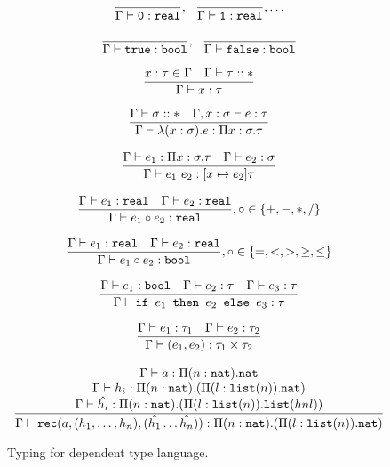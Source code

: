 \begin{figure}
\[
\begin{array}{c}
 \\ \\
\dfrac{}{\Gamma \vdash \texttt{0}: \texttt{real}}, \ \ \dfrac{}{\Gamma \vdash \texttt{1}: \texttt{real}}, \ldots \\ \\
\dfrac{}{\Gamma \vdash \texttt{true} : \texttt{bool}}, \ \ \dfrac{}{\Gamma \vdash \texttt{false} : \texttt{bool}} \\  \\
\dfrac{x : \tau \in \Gamma \ \ \ \Gamma \vdash \tau :: *}{\Gamma \vdash x : \tau } \\ \\ 
\dfrac{\Gamma \vdash \sigma :: * \ \ \ \Gamma, x : \sigma \vdash e : \tau}
	{\Gamma \vdash \lambda (x : \sigma).e : \Pi x:\sigma.\tau } \\ \\
\dfrac{\Gamma \vdash e_1: \Pi x:\sigma.\tau \ \ \ \Gamma \vdash e_2 : \sigma}
	{\Gamma \vdash e_1 \ e_2 : [x \mapsto e_2]\tau} \\ \\
\dfrac{\Gamma \vdash e_1 : \texttt{real} \ \ \ \Gamma \vdash e_2 : \texttt{real}}
	{\Gamma \vdash e_1 \circ e_2 : \texttt{real}}
, \circ \in \{+,-,*,/\} \\ \\ 
\dfrac{\Gamma \vdash e_1 : \texttt{real} \ \ \ \Gamma \vdash e_2 : \texttt{real}}
	{\Gamma \vdash e_1 \circ e_2 : \texttt{bool}}
	, \circ \in \{=, <, >, \geq, \leq\} \\ \\ 
\dfrac{\Gamma \vdash e_1 : \texttt{bool} \ \ \ \Gamma \vdash e_2 : \tau \ \ \ \Gamma \vdash e_3 : \tau}
	{\Gamma \vdash \ifelse{e_1}{e_2}{e_3} : \tau} \\ \\ 
\dfrac{\Gamma \vdash e_1 : \tau_1 \ \ \ \Gamma \vdash e_2 : \tau_2}{\Gamma \vdash (e_1,e_2) : \tau_1 \times \tau_2}\\ \\
\Gamma \vdash a: \Pi (n:\texttt{nat}).\texttt{nat} \\
\Gamma \vdash h_i: \Pi(n:\texttt{nat}).(\Pi (l:\lst(n)).\texttt{nat}) \\
\dfrac{\Gamma \vdash \hat{h_i}: \Pi(n: \texttt{nat}).(\Pi(l : \lst(n)).\lst(h n l))}
	{\Gamma \vdash \texttt{rec}(a, (h_1, \ldots, h_n), (\hat{h_1} \ldots \hat{h_n})) : \Pi(n:\texttt{nat}).(\Pi (l:\lst(n)).
\texttt{nat})}
\end{array}
\]
\caption{Typing for dependent type language.}
\end{figure}

